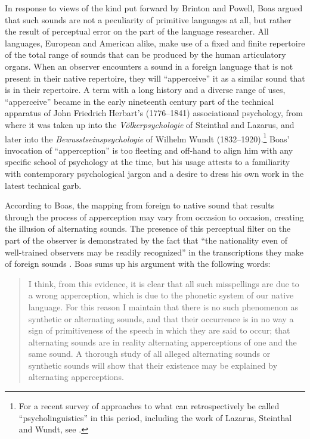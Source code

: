 \documentclass[output=paper]{langscibook}
\begin{document}
In response to views of the kind put forward by Brinton and Powell, Boas argued that such sounds are not a peculiarity of primitive languages at all, but rather the result of perceptual error on the part of the language researcher. All languages, European and American alike, make use of a fixed and finite repertoire of the total range of sounds that can be produced by the human articulatory organs. When an observer encounters a sound in a foreign language that is not present in their native repertoire, they will ``apperceive'' it as a similar sound that is in their repertoire. A term with a long history and a diverse range of uses, ``apperceive'' became in the early nineteenth century part of the technical apparatus of John Friedrich Herbart's (1776–1841) associational psychology, from where it was taken up into the \emph{Völkerpsychologie} of Steinthal and Lazarus, and later into the \emph{Bewusstseinspsychologie} of Wilhelm Wundt (1832–1920).\footnote{For a recent survey of approaches to what can retrospectively be called ``psycholinguistics'' in this period, including the work of Lazarus, Steinthal and Wundt, see \citet{Levelt2013}.} Boas' invocation of ``apperception'' is too fleeting and off-hand to align him with any specific school of psychology at the time, but his usage attests to a familiarity with contemporary psychological jargon and a desire to dress his own work in the latest technical garb.

According to Boas, the mapping from foreign to native sound that results through the process of apperception may vary from occasion to occasion, creating the illusion of alternating sounds. The presence of this perceptual filter on the part of the observer is demonstrated by the fact that ``the nationality even of well-trained observers may be readily recognized'' in the transcriptions they make of foreign sounds \citep[51]{Boas1889}. Boas sums up his argument with the following words:

\begin{quotation}
I think, from this evidence, it is clear that all such misspellings are due to a wrong apperception, which is due to the phonetic system of our native language. For this reason I maintain that there is no such phenomenon as synthetic or alternating sounds, and that their occurrence is in no way a sign of primitiveness of the speech in which they are said to occur; that alternating sounds are in reality alternating apperceptions of one and the same sound. A thorough study of all alleged alternating sounds or synthetic sounds will show that their existence may be explained by alternating apperceptions. \citep[52]{Boas1889}
\end{quotation}
\end{document}
